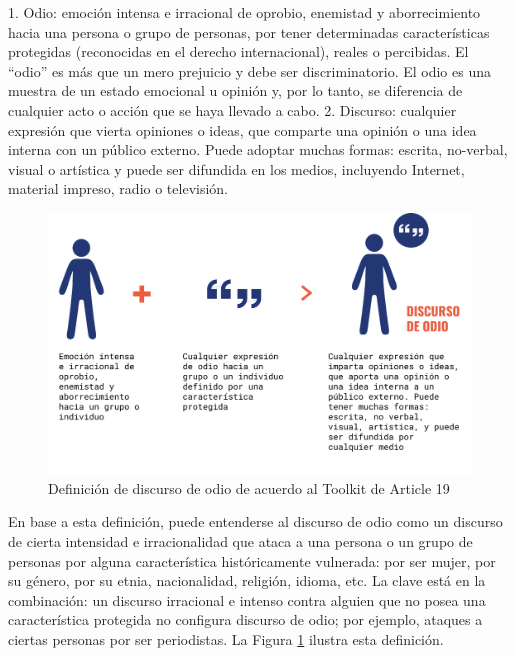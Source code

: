 \begin{displayquote}
    1. Odio: emoción intensa e irracional de oprobio, enemistad y aborrecimiento hacia una persona o grupo de personas, por tener determinadas características protegidas (reconocidas en el derecho internacional), reales o percibidas. El “odio” es más que un mero prejuicio y debe ser discriminatorio. El odio es una muestra de un estado emocional u opinión y, por lo tanto, se diferencia de cualquier acto o acción que se haya llevado a cabo.
    2. Discurso: cualquier expresión que vierta opiniones o ideas, que comparte una opinión o una idea interna con un público externo. Puede adoptar muchas formas: escrita, no-verbal, visual o artística y puede ser difundida en los medios, incluyendo Internet, material impreso, radio o televisión.
\end{displayquote}


\begin{figure}[t]
    \centering
    \includegraphics[width=\textwidth]{img/discurso_de_odio.pdf}
    \caption{Definición de discurso de odio de acuerdo al Toolkit de Article 19}
    \label{fig:hate_speech_definition_article_19}
\end{figure}


En base a esta definición, puede entenderse al discurso de odio como un discurso de cierta intensidad e irracionalidad que ataca a una persona o un grupo de personas por alguna característica históricamente vulnerada: por ser mujer, por su género, por su etnia, nacionalidad, religión, idioma, etc. La clave está en la combinación: un discurso irracional e intenso contra alguien que no posea una característica protegida no configura discurso de odio; por ejemplo, ataques a ciertas personas por ser periodistas. La Figura \ref{fig:hate_speech_definition_article_19} ilustra esta definición.

